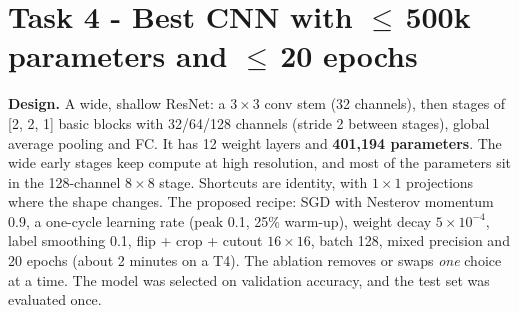 \documentclass[10pt,a4paper]{article}
\begin{document}
\section{\texorpdfstring{Task 4 - Best CNN with $\le$\,500k parameters and $\le$\,20 epochs}{Task 4 - Best CNN with at most 500k parameters and 20 epochs}}
\textbf{Design.} A wide, shallow ResNet: a $3\times3$ conv stem (32 channels), then stages of [2, 2, 1] basic blocks with
32/64/128 channels (stride 2 between stages), global average pooling and FC. It has 12 weight layers and \textbf{401{,}194 parameters}.
The wide early stages keep compute at high resolution, and most of the parameters sit in the 128-channel $8\times8$ stage. Shortcuts
are identity, with $1\times1$ projections where the shape changes. The proposed recipe: SGD with Nesterov momentum 0.9, a one-cycle
learning rate (peak 0.1, 25\% warm-up), weight decay $5\times10^{-4}$, label smoothing 0.1, flip + crop + cutout $16\times16$, batch
128, mixed precision and 20 epochs (about 2 minutes on a T4). The ablation removes or swaps \emph{one} choice at a time. The model
was selected on validation accuracy, and the test set was evaluated once.
\end{document}
